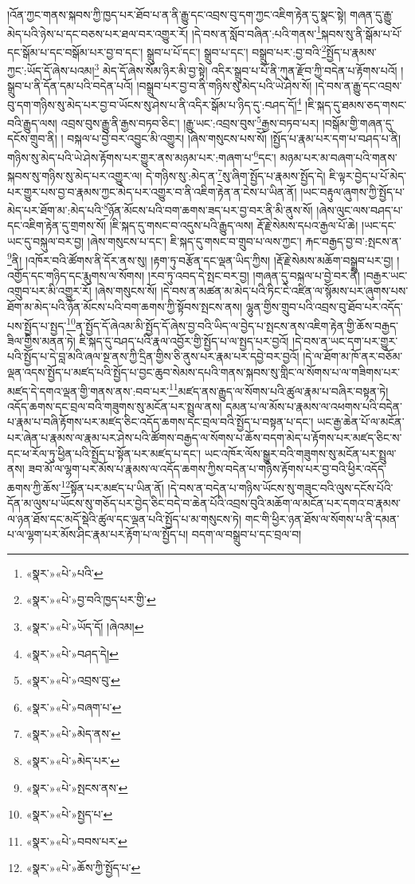 །འོན་ཀྱང་གནས་སྐབས་ཀྱི་ཁྱད་པར་ཐོབ་པ་ན་ནི་རྒྱུ་དང་འབྲས་བུ་དག་ཀྱང་འཇིག་རྟེན་དུ་སྣང་སྟེ། གཞན་དུ་རྒྱུ་མེད་པའི་ཉེས་པ་དང་བཅས་པར་ཐལ་བར་འགྱུར་རོ། །དེ་བས་ན་སློབ་བཞིན་:པའི་གནས་\footnote{«སྣར་»«པེ་»པའི་}སྐབས་སུ་ནི་སྒོམ་པ་པོ་དང་སྒོམ་པ་དང་བསྒོམ་པར་བྱ་བ་དང་། སྒྲུབ་པ་པོ་དང་། སྒྲུབ་པ་དང་། བསྒྲུབ་པར་:བྱ་བའི་\footnote{«སྣར་»«པེ་»བྱ་བའི་ཁྱད་པར་གྱི་}སྤྱོད་པ་རྣམས་ཀྱང་:ཡོད་དོ་ཞེས་པའམ།\footnote{«སྣར་»«པེ་»ཡོད་དོ། །ཞེའམ།} མེད་དོ་ཞེས་སོམ་ཉིར་མི་བྱ་སྟེ། འདིར་སྒྲུབ་པ་པོ་ནི་ཀུན་རྫོབ་ཀྱི་བདེན་པ་རྟོགས་པའོ། །སྒྲུབ་པ་ནི་དོན་དམ་པའི་བདེན་པའོ། །བསྒྲུབ་པར་བྱ་བ་ནི་གཉིས་སུ་མེད་པའི་ཡེ་ཤེས་སོ། །དེ་བས་ན་རྒྱུ་དང་འབྲས་བུ་དག་གཉིས་སུ་མེད་པར་བྱ་བ་ཡོངས་སུ་ཤེས་པ་ནི་འདིར་སྒོམ་པ་ཉིད་དུ་:བཤད་དོ།\footnote{«སྣར་»«པེ་»བཤད་དེ།} །ཇི་སྐད་དུ་ཐམས་ཅད་གསང་བའི་རྒྱུད་ལས། འབྲས་བུས་རྒྱུ་ནི་རྒྱས་བཏབ་ཅིང་། །རྒྱུ་ཡང་:འབྲས་བུས་\footnote{«སྣར་»«པེ་»འབྲས་བུ་}རྒྱས་བཏབ་པར། །བསྒོམ་གྱི་གཞན་དུ་དངོས་གྲུབ་ནི། །
བསྐལ་པ་བྱེ་བར་འབྱུང་མི་འགྱུར། །ཞེས་གསུངས་པས་སོ། །སྤྱོད་པ་རྣམ་པར་དག་པ་བཤད་པ་ནི། གཉིས་སུ་མེད་པའི་ཡེ་ཤེས་རྟོགས་པར་གྱུར་ནས་མཉམ་པར་:གཞག་པ་\footnote{«སྣར་»«པེ་»བཞག་པ་}དང་། མཉམ་པར་མ་བཞག་པའི་གནས་སྐབས་སུ་གཉིས་སུ་མེད་པར་འགྱུར་ལ། དེ་གཉིས་སུ་:མེད་ན་\footnote{«སྣར་»«པེ་»མེད་ནས་}སུ་ཞིག་སྤྱོད་པ་རྣམས་སྤྱོད་དེ། ཇི་ལྟར་བྱེད་པ་པོ་མེད་པར་གྱུར་པས་བྱ་བ་རྣམས་ཀྱང་མེད་པར་འགྱུར་བ་ནི་འཇིག་རྟེན་ན་ངེས་པ་ཡིན་ནོ། །ཡང་བརྟུལ་ཞུགས་ཀྱི་སྤྱོད་པ་མེད་པར་ཐོག་མ་:མེད་པའི་\footnote{«སྣར་»«པེ་»མེད་པར་}ཉོན་མོངས་པའི་བག་ཆགས་ཟད་པར་བྱ་བར་ནི་མི་ནུས་སོ། །ཞེས་ལུང་ལས་བཤད་པ་དང་འཇིག་རྟེན་དུ་གྲགས་སོ། །ཇི་སྐད་དུ་གསང་བ་འདུས་པའི་རྒྱུད་ལས། རྡོ་རྗེ་སེམས་དཔའ་རྒྱལ་པོ་ཆེ། །ཡང་དང་ཡང་དུ་བསྐུལ་བར་བྱ། །ཞེས་གསུངས་པ་དང་། ཇི་སྐད་དུ་གསང་བ་གྲུབ་པ་ལས་ཀྱང་། རྐང་བརྒྱད་བྱ་བ་:སྤངས་ན་\footnote{«སྣར་»«པེ་»སྤངས་ནས་}ནི། །འཁོར་བའི་ཚོགས་ནི་དོར་ནས་སུ། །རྟག་ཏུ་བརྩོན་དང་ལྡན་ཡིད་ཀྱིས། །རྡོ་རྗེ་སེམས་མཆོག་བསྒྲུབ་པར་བྱ། །འགྱོད་དང་གཉིད་དང་རྨུགས་ལ་སོགས། །རབ་ཏུ་འབད་དེ་སྤང་བར་བྱ། །གཞན་དུ་བསྐལ་པ་བྱེ་བར་ནི། །བརྒྱར་ཡང་འགྲུབ་པར་མི་འགྱུར་རོ། །ཞེས་གསུངས་སོ། །དེ་བས་ན་མཚན་མ་མེད་པའི་ཏིང་ངེ་འཛིན་ལ་སྙོམས་པར་ཞུགས་པས་ཐོག་མ་མེད་པའི་ཉོན་མོངས་པའི་བག་ཆགས་ཀྱི་སྟོབས་སྤངས་ནས། ལྷུན་གྱིས་གྲུབ་པའི་འབྲས་བུ་ཐོབ་པར་འདོད་པས་སྤྱོད་པ་སྤྱད་\footnote{«སྣར་»«པེ་»སྤྱད་པ་}ན་སྤྱོད་དོ་ཞེའམ་མི་སྤྱོད་དོ་ཞེས་བྱ་བའི་ཡིད་ལ་བྱེད་པ་སྤངས་ནས་འཇིག་རྟེན་གྱི་ཆོས་བརྒྱད་ཟིལ་གྱིས་མནན་ཏེ། ཇི་སྐད་དུ་བཤད་པའི་རྣལ་འབྱོར་གྱི་སྤྱོད་པ་ལ་སྤྱད་པར་བྱའོ། །དེ་བས་ན་ཡང་དག་པར་གྱུར་པའི་སྤྱོད་པ་དེ་བླ་མའི་ཞལ་སྔ་ནས་ཀྱི་དྲིན་གྱིས་ཅི་ནུས་པར་རྣམ་པར་དབྱེ་བར་བྱའོ། །དེ་ལ་ཐོག་མ་ཁོ་ནར་བཅོམ་ལྡན་འདས་སྤྱོད་པ་མཛད་པའི་སྤྱོད་པ་བྱང་ཆུབ་སེམས་དཔའི་གནས་སྐབས་སུ་གླིང་ལ་སོགས་པ་ལ་གཟིགས་པར་མཛད་དེ་དགའ་ལྡན་གྱི་གནས་ནས་:བབ་པར་\footnote{«སྣར་»«པེ་»བབས་པར་}མཛད་ནས་རྒྱུད་ལ་སོགས་པའི་ཚུལ་རྣམ་པ་བཞིར་བསྟན་ཏེ། འདོད་ཆགས་དང་བྲལ་བའི་གཟུགས་སུ་མངོན་པར་སྤྲུལ་ནས། དམན་པ་ལ་མོས་པ་རྣམས་ལ་འཕགས་པའི་བདེན་པ་རྣམ་པ་བཞི་རྟོགས་པར་མཛད་ཅིང་འདོད་ཆགས་དང་བྲལ་བའི་སྤྱོད་པ་བསྟན་པ་དང་། ཡང་རྒྱ་ཆེན་པོ་ལ་མངོན་པར་ཞེན་པ་རྣམས་ལ་རྣམ་པར་ཤེས་པའི་ཚོགས་བརྒྱད་ལ་སོགས་པ་ཆོས་བདག་མེད་པ་རྟོགས་པར་མཛད་ཅིང་ས་དང་ཕ་རོལ་ཏུ་ཕྱིན་པའི་སྤྱོད་པ་སྟོན་པར་མཛད་པ་དང་། ཡང་འཁོར་ལོས་སྒྱུར་བའི་གཟུགས་སུ་མངོན་པར་སྤྲུལ་ནས། ཟབ་མོ་ལ་ལྷག་པར་མོས་པ་རྣམས་ལ་འདོད་ཆགས་ཀྱིས་བདེན་པ་གཉིས་རྟོགས་པར་བྱ་བའི་ཕྱིར་འདོད་ཆགས་ཀྱི་ཆོས་\footnote{«སྣར་»«པེ་»ཆོས་ཀྱི་སྤྱོད་པ་}སྟོན་པར་མཛད་པ་ཡིན་ནོ། །དེ་བས་ན་བདེན་པ་གཉིས་ཡོངས་སུ་གཟུང་བའི་ལུས་དངོས་པོའི་དོན་མ་ལུས་པ་ཡོངས་སུ་གཅོད་པར་བྱེད་ཅིང་བདེ་བ་ཆེན་པོའི་འབྲས་བུའི་མཆོག་ལ་མངོན་པར་དགའ་བ་རྣམས་ལ་ཉན་ཐོས་དང་མདོ་སྡེའི་ཚུལ་དང་ལྡན་པའི་སྤྱོད་པ་མ་གསུངས་ཏེ། གང་གི་ཕྱིར་ཉན་ཐོས་ལ་སོགས་པ་ནི་དམན་པ་ལ་ལྷག་པར་མོས་ཤིང་རྣམ་པར་རྟོག་པ་ལ་སྤྱོད་པ། བདག་ལ་བསྒྲུབ་པ་དང་བྲལ་བ། 